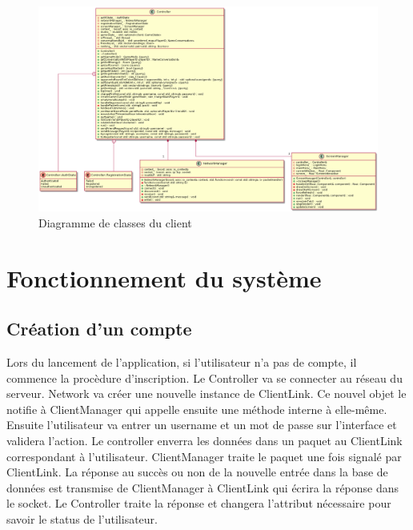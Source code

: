 \documentclass{article}
\begin{document}
\begin{figure}[H]
	\centering
	 \includegraphics[scale=0.3]{../res/uml/class/ClientStructureClass.png}
	 \caption{Diagramme de classes du client}
	 \label{fig:WholeClientDiagram}
\end{figure}

\newpage

\section{Fonctionnement du système}

\subsection{Création d'un compte}

Lors du lancement de l'application, si l'utilisateur n'a pas de compte, il commence la procèdure d'inscription. Le Controller va se connecter au réseau du serveur. Network va créer une nouvelle instance de ClientLink. Ce nouvel objet le notifie à ClientManager qui appelle ensuite une méthode interne à elle-même. Ensuite l'utilisateur va entrer un username et un mot de passe sur l'interface et validera l'action. Le controller enverra les données dans un paquet au ClientLink correspondant à l'utilisateur. ClientManager traite le paquet une fois signalé par ClientLink. La réponse au succès ou non de la nouvelle entrée dans la base de données est transmise de ClientManager à ClientLink qui écrira la réponse dans le socket. Le Controller traite la réponse et changera l'attribut nécessaire pour savoir le status de l'utilisateur.
\end{document}
